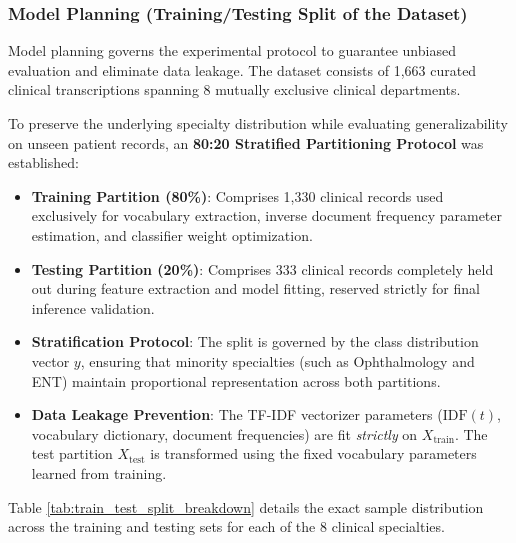 \subsubsection{Model Planning (Training/Testing Split of the Dataset)}

Model planning governs the experimental protocol to guarantee unbiased evaluation and eliminate data leakage. The dataset consists of 1,663 curated clinical transcriptions spanning 8 mutually exclusive clinical departments.

To preserve the underlying specialty distribution while evaluating generalizability on unseen patient records, an \textbf{80:20 Stratified Partitioning Protocol} was established:
\begin{itemize}
    \item \textbf{Training Partition (80\%)}: Comprises 1,330 clinical records used exclusively for vocabulary extraction, inverse document frequency parameter estimation, and classifier weight optimization.
    \item \textbf{Testing Partition (20\%)}: Comprises 333 clinical records completely held out during feature extraction and model fitting, reserved strictly for final inference validation.
    \item \textbf{Stratification Protocol}: The split is governed by the class distribution vector $y$, ensuring that minority specialties (such as Ophthalmology and ENT) maintain proportional representation across both partitions.
    \item \textbf{Data Leakage Prevention}: The TF-IDF vectorizer parameters ($\text{IDF}(t)$, vocabulary dictionary, document frequencies) are fit \textit{strictly} on $X_{\text{train}}$. The test partition $X_{\text{test}}$ is transformed using the fixed vocabulary parameters learned from training.
\end{itemize}

Table \ref{tab:train_test_split_breakdown} details the exact sample distribution across the training and testing sets for each of the 8 clinical specialties.

